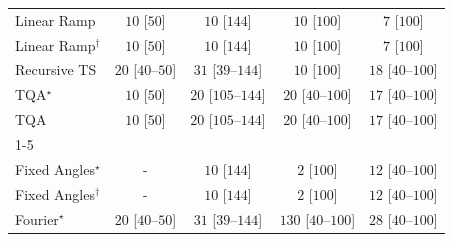 \begin{tabular}{l|cccc|}
Linear Ramp & {\cellcolor[HTML]{F6FCF4}} \color[HTML]{000000} $10$ [$50$] & {\cellcolor[HTML]{F6FCF4}} \color[HTML]{000000} $10$ [$144$] & {\cellcolor[HTML]{F6FCF4}} \color[HTML]{000000} $10$ [$100$] & {\cellcolor[HTML]{F6FCF4}} \color[HTML]{000000} $7$ [$100$] \\
Linear Ramp$^\dagger$ & {\cellcolor[HTML]{F6FCF4}} \color[HTML]{000000} $10$ [$50$] & {\cellcolor[HTML]{F6FCF4}} \color[HTML]{000000} $10$ [$144$] & {\cellcolor[HTML]{F6FCF4}} \color[HTML]{000000} $10$ [$100$] & {\cellcolor[HTML]{F6FCF4}} \color[HTML]{000000} $7$ [$100$] \\
Recursive TS & {\cellcolor[HTML]{F4FBF2}} \color[HTML]{000000} $20$ [$40$--$50$] & {\cellcolor[HTML]{F2FAEF}} \color[HTML]{000000} $31$ [$39$--$144$] & {\cellcolor[HTML]{F6FCF4}} \color[HTML]{000000} $10$ [$100$] & {\cellcolor[HTML]{F4FBF2}} \color[HTML]{000000} $18$ [$40$--$100$] \\
TQA$^\star$ & {\cellcolor[HTML]{F6FCF4}} \color[HTML]{000000} $10$ [$50$] & {\cellcolor[HTML]{F4FBF2}} \color[HTML]{000000} $20$ [$105$--$144$] & {\cellcolor[HTML]{F4FBF2}} \color[HTML]{000000} $20$ [$40$--$100$] & {\cellcolor[HTML]{F5FBF2}} \color[HTML]{000000} $17$ [$40$--$100$] \\
TQA & {\cellcolor[HTML]{F6FCF4}} \color[HTML]{000000} $10$ [$50$] & {\cellcolor[HTML]{F4FBF2}} \color[HTML]{000000} $20$ [$105$--$144$] & {\cellcolor[HTML]{F4FBF2}} \color[HTML]{000000} $20$ [$40$--$100$] & {\cellcolor[HTML]{F5FBF2}} \color[HTML]{000000} $17$ [$40$--$100$] \\
\cline{1-5}
\multicolumn{5}{c}{\rule{0pt}{8pt}PP} \\
\midrule
Fixed Angles$^\star$ & {\cellcolor[HTML]{000000}} \color[HTML]{F1F1F1} {\cellcolor{white}} \color{black} - & {\cellcolor[HTML]{F6FCF4}} \color[HTML]{000000} $10$ [$144$] & {\cellcolor[HTML]{F7FCF5}} \color[HTML]{000000} $2$ [$100$] & {\cellcolor[HTML]{F5FBF3}} \color[HTML]{000000} $12$ [$40$--$100$] \\
Fixed Angles$^\dagger$ & {\cellcolor[HTML]{000000}} \color[HTML]{F1F1F1} {\cellcolor{white}} \color{black} - & {\cellcolor[HTML]{F6FCF4}} \color[HTML]{000000} $10$ [$144$] & {\cellcolor[HTML]{F7FCF5}} \color[HTML]{000000} $2$ [$100$] & {\cellcolor[HTML]{F5FBF3}} \color[HTML]{000000} $12$ [$40$--$100$] \\
Fourier$^\star$ & {\cellcolor[HTML]{F4FBF2}} \color[HTML]{000000} $20$ [$40$--$50$] & {\cellcolor[HTML]{F2FAEF}} \color[HTML]{000000} $31$ [$39$--$144$] & {\cellcolor[HTML]{DCF2D7}} \color[HTML]{000000} $130$ [$40$--$100$] & {\cellcolor[HTML]{F2FAF0}} \color[HTML]{000000} $28$ [$40$--$100$] \\

\end{tabular}
